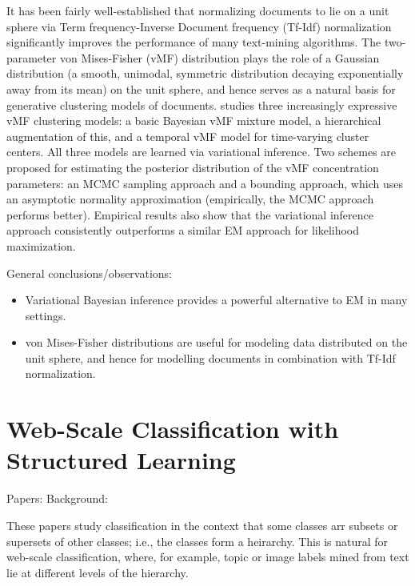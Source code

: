 \documentclass{article} %
\begin{document}
It has been fairly well-established that normalizing documents to lie on a unit
sphere via Term frequency-Inverse Document frequency (Tf-Idf) normalization
significantly improves the performance of many text-mining algorithms. The
two-parameter von Mises-Fisher (vMF) distribution plays the role of a Gaussian
distribution (a smooth, unimodal, symmetric distribution decaying exponentially
away from its mean) on the unit sphere, and hence serves as a natural basis for
generative clustering models of documents. \cite{gopal14VMF} studies three
increasingly expressive vMF clustering models: a basic Bayesian vMF mixture
model, a hierarchical augmentation of this, and a temporal vMF model for
time-varying cluster centers. All three models are learned via variational
inference. Two schemes are proposed for estimating the posterior distribution
of the vMF concentration parameters: an MCMC sampling approach and a bounding
approach, which uses an asymptotic normality approximation (empirically, the
MCMC approach performs better). Empirical results also show that the
variational inference approach consistently outperforms a similar EM approach
for likelihood maximization.

General conclusions/observations:
\begin{itemize}
\item Variational Bayesian inference provides a powerful alternative to EM in
many settings.
\item von Mises-Fisher distributions are useful for modeling data distributed
on the unit sphere, and hence for modelling documents in combination with
Tf-Idf normalization.
\end{itemize}

\section{Web-Scale Classification with Structured Learning}
Papers:
    \cite{gopal12hierarchicalclass,
          gopal13recursiveregularization}
\quad
Background:
          \cite{bishop06machinelearning}

These papers study classification in the context that some classes arr subsets
or supersets of other classes; i.e., the classes form a heirarchy. This is
natural for web-scale classification, where, for example, topic or image labels
mined from text lie at different levels of the hierarchy.
\end{document}

